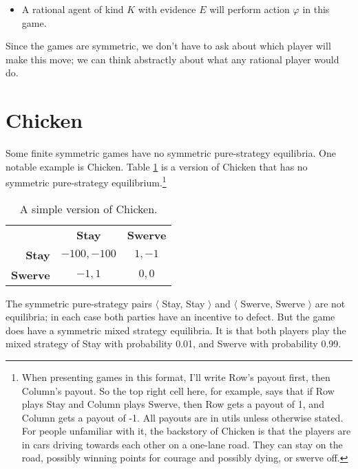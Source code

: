 \documentclass[
  11pt,
]{article}
\providecommand{\tightlist}{%
  \setlength{\itemsep}{0pt}\setlength{\parskip}{0pt}}
\begin{document}
\begin{itemize}
\tightlist
\item
  A rational agent of kind \(K\) with evidence \(E\) will perform action \(\varphi\) in this game.
\end{itemize}

Since the games are symmetric, we don't have to ask about which player will make this move; we can think abstractly about what any rational player would do.

\hypertarget{chicken}{%
\section{Chicken}\label{chicken}}

Some finite symmetric games have no symmetric pure-strategy equilibria. One notable example is Chicken. Table \ref{tab:chicken} is a version of Chicken that has no symmetric pure-strategy equilibrium.\footnote{When presenting games in this format, I'll write Row's payout first, then Column's payout. So the top right cell here, for example, says that if Row plays Stay and Column plays Swerve, then Row gets a payout of 1, and Column gets a payout of -1. All payouts are in utils unless otherwise stated. For people unfamiliar with it, the backstory of Chicken is that the players are in cars driving towards each other on a one-lane road. They can stay on the road, possibly winning points for courage and possibly dying, or swerve off.}

\renewcommand{\arraystretch}{1.2}   
\begin{table}

\caption{\label{tab:chicken}A simple version of Chicken.}
\centering \vspace{4pt}
\begin{tabular}[t]{>{}r>{}c>{}c}

\textbf{} & \textbf{Stay} & \textbf{Swerve}\\

\textbf{Stay} & $-100, -100$ & $1, -1$\\
\textbf{Swerve} & $-1, 1$ & $0, 0$\\

\end{tabular}
\end{table}

The symmetric pure-strategy pairs \(\langle\) Stay, Stay \(\rangle\) and \(\langle\) Swerve, Swerve \(\rangle\) are not equilibria; in each case both parties have an incentive to defect. But the game does have a symmetric mixed strategy equilibria. It is that both players play the mixed strategy of Stay with probability 0.01, and Swerve with probability 0.99.
\end{document}
